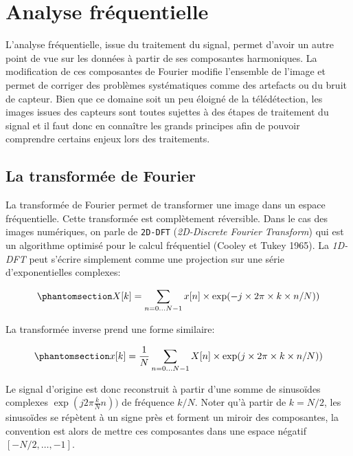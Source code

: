 \documentclass[
  french,
  11pt,
  letterpaper,
  open=any,
  twoside=false,
  french]{scrbook}
\begin{document}
\section{Analyse fréquentielle}\label{analyse-fruxe9quentielle}

L'analyse fréquentielle, issue du traitement du signal, permet d'avoir
un autre point de vue sur les données à partir de ses composantes
harmoniques. La modification de ces composantes de Fourier modifie
l'ensemble de l'image et permet de corriger des problèmes systématiques
comme des artefacts ou du bruit de capteur. Bien que ce domaine soit un
peu éloigné de la télédétection, les images issues des capteurs sont
toutes sujettes à des étapes de traitement du signal et il faut donc en
connaître les grands principes afin de pouvoir comprendre certains
enjeux lors des traitements.

\subsection{La transformée de
Fourier}\label{la-transformuxe9e-de-fourier}

La transformée de Fourier permet de transformer une image dans un espace
fréquentielle. Cette transformée est complètement réversible. Dans le
cas des images numériques, on parle de \texttt{2D-DFT}
(\emph{2D-Discrete Fourier Transform}) qui est un algorithme optimisé
pour le calcul fréquentiel (Cooley et Tukey 1965). La \emph{1D-DFT} peut
s'écrire simplement comme une projection sur une série d'exponentielles
complexes:

\begin{equation}\protect\phantomsection\label{eq-dft}{X[k] = \sum_{n=0 \ldots N-1} x[n] \times \exp(-j \times 2\pi \times k \times n/N))}\end{equation}

La transformée inverse prend une forme similaire:

\begin{equation}\protect\phantomsection\label{eq-idft}{x[k] = \frac{1}{N}\sum_{n=0 \ldots N-1} X[n] \times \exp(j \times 2\pi \times k \times n/N))}\end{equation}

Le signal d'origine est donc reconstruit à partir d'une somme de
sinusoïdes complexes \(\exp(j2\pi \frac{k}{N}n))\) de fréquence \(k/N\).
Noter qu'à partir de \(k=N/2\), les sinusoïdes se répètent à un signe
près et forment un miroir des composantes, la convention est alors de
mettre ces composantes dans une espace négatif \([-N/2,\ldots,-1]\).
\end{document}

